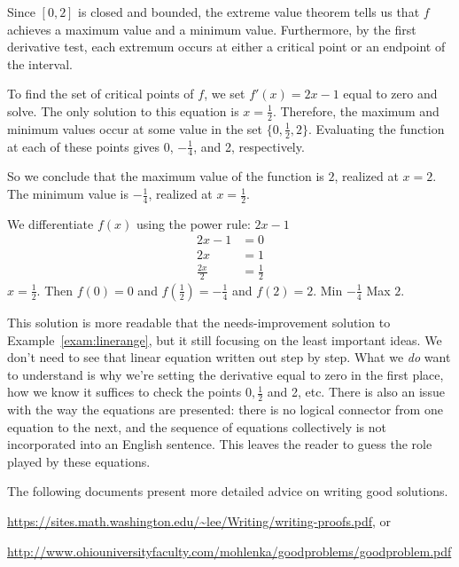 \documentclass{watsonbook}
\begin{document}
  \begin{solution}[title=Good solution] 
    Since $[0,2]$ is closed and bounded, the extreme value theorem
    tells us that $f$ achieves a maximum value and a minimum
    value. Furthermore, by the first derivative test, each extremum
    occurs at either a critical point or an endpoint of the interval.

    To find the set of critical points of $f$, we set
    $f'(x) = 2x - 1$ equal to zero and solve. The only solution to
    this equation is $x = \tfrac{1}{2}$. Therefore, the maximum and
    minimum values occur at some value in the set $\{0,\tfrac{1}{2},
    2\}$. Evaluating the function at each of these points gives 0,
    $-\tfrac{1}{4}$, and 2, respectively.

    So we conclude that the maximum value of the function is 
    $\boxed{2}$, realized at $x=2$. The minimum value is
    $\boxed{-\tfrac{1}{4}}$, realized at $x = \tfrac{1}{2}$. 
  \end{solution}

  \begin{solution}[title=Solution that needs improvement] 
    We differentiate $f(x)$ using the power rule: $2x-1$ 
    \begin{align*}
      2x - 1 &= 0 \\
      2x &= 1  \\
      \frac{2x}{2} &= \frac{1}{2}
    \end{align*}
    $x = \tfrac{1}{2}$. Then $f(0) = 0$ and $f(\tfrac{1}{2}) =
    -\tfrac{1}{4}$ and $f(2) = 2$. Min $-\tfrac{1}{4}$ Max $2$. 
  \end{solution}

  This solution is more readable that the needs-improvement solution
  to Example~\ref{exam:linerange}, but it still focusing on the least
  important ideas.  We don't need to see that linear equation written
  out step by step. What we \textit{do} want to understand is why
  we're setting the derivative equal to zero in the first place, how
  we know it suffices to check the points $0, \tfrac{1}{2}$ and 2,
  etc. There is also an issue with the way the equations are
  presented: there is no logical connector from one equation to the
  next, and the sequence of equations collectively is not incorporated
  into an English sentence. This leaves the reader to guess the role
  played by these equations. 

  The following documents present more detailed advice on writing good
  solutions. 
  \begin{center}
    \url{https://sites.math.washington.edu/~lee/Writing/writing-proofs.pdf},
    or 

    \url{http://www.ohiouniversityfaculty.com/mohlenka/goodproblems/goodproblem.pdf}
  \end{center}
\end{document}
